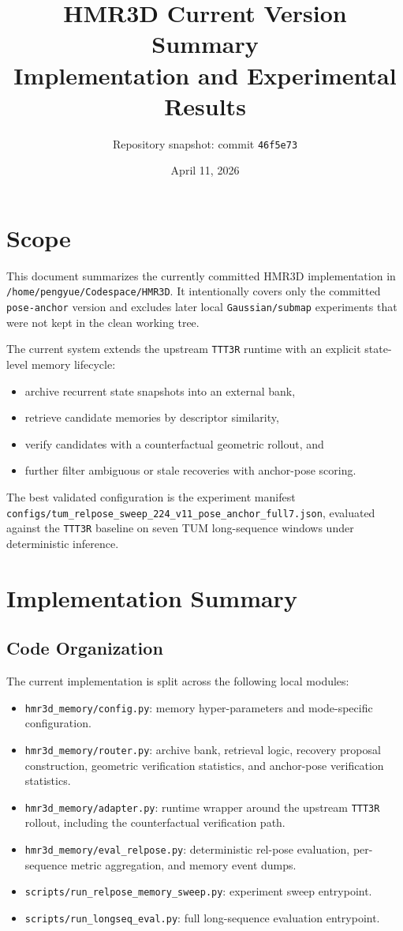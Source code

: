 \documentclass[11pt]{article}
\title{HMR3D Current Version Summary\\Implementation and Experimental Results}
\author{Repository snapshot: commit \texttt{46f5e73}}
\date{April 11, 2026}
\begin{document}
\maketitle

\section{Scope}
This document summarizes the currently committed HMR3D implementation in
\texttt{/home/pengyue/Codespace/HMR3D}. It intentionally covers only the
committed \texttt{pose-anchor} version and excludes later local
\texttt{Gaussian/submap} experiments that were not kept in the clean working
tree.

The current system extends the upstream \texttt{TTT3R} runtime with an explicit
state-level memory lifecycle:
\begin{itemize}
\item archive recurrent state snapshots into an external bank,
\item retrieve candidate memories by descriptor similarity,
\item verify candidates with a counterfactual geometric rollout, and
\item further filter ambiguous or stale recoveries with anchor-pose scoring.
\end{itemize}

The best validated configuration is the experiment manifest
\texttt{configs/tum\_relpose\_sweep\_224\_v11\_pose\_anchor\_full7.json}, evaluated
against the \texttt{TTT3R} baseline on seven TUM long-sequence windows under
deterministic inference.

\section{Implementation Summary}
\subsection{Code Organization}
The current implementation is split across the following local modules:
\begin{itemize}
\item \texttt{hmr3d\_memory/config.py}: memory hyper-parameters and mode-specific
configuration.
\item \texttt{hmr3d\_memory/router.py}: archive bank, retrieval logic, recovery
proposal construction, geometric verification statistics, and anchor-pose
verification statistics.
\item \texttt{hmr3d\_memory/adapter.py}: runtime wrapper around the upstream
\texttt{TTT3R} rollout, including the counterfactual verification path.
\item \texttt{hmr3d\_memory/eval\_relpose.py}: deterministic rel-pose
evaluation, per-sequence metric aggregation, and memory event dumps.
\item \texttt{scripts/run\_relpose\_memory\_sweep.py}: experiment sweep entrypoint.
\item \texttt{scripts/run\_longseq\_eval.py}: full long-sequence evaluation
entrypoint.
\end{itemize}
\end{document}
